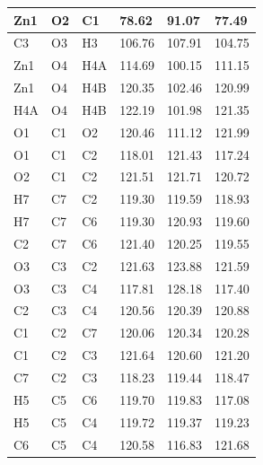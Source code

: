 \begin{table}[H]
\begin{tabular}{|l|l|l|lll|}
Zn1 & O2 & C1 & \multicolumn{1}{l|}{78.62} & \multicolumn{1}{l|}{91.07} & 77.49 \\ \hline
C3 & O3 & H3 & \multicolumn{1}{l|}{106.76} & \multicolumn{1}{l|}{107.91} & 104.75 \\ \hline
Zn1 & O4 & H4A & \multicolumn{1}{l|}{114.69} & \multicolumn{1}{l|}{100.15} & 111.15 \\ \hline
Zn1 & O4 & H4B & \multicolumn{1}{l|}{120.35} & \multicolumn{1}{l|}{102.46} & 120.99 \\ \hline
H4A & O4 & H4B & \multicolumn{1}{l|}{122.19} & \multicolumn{1}{l|}{101.98} & 121.35 \\ \hline
O1 & C1 & O2 & \multicolumn{1}{l|}{120.46} & \multicolumn{1}{l|}{111.12} & 121.99 \\ \hline
O1 & C1 & C2 & \multicolumn{1}{l|}{118.01} & \multicolumn{1}{l|}{121.43} & 117.24 \\ \hline
O2 & C1 & C2 & \multicolumn{1}{l|}{121.51} & \multicolumn{1}{l|}{121.71} & 120.72 \\ \hline
H7 & C7 & C2 & \multicolumn{1}{l|}{119.30} & \multicolumn{1}{l|}{119.59} & 118.93 \\ \hline
H7 & C7 & C6 & \multicolumn{1}{l|}{119.30} & \multicolumn{1}{l|}{120.93} & 119.60 \\ \hline
C2 & C7 & C6 & \multicolumn{1}{l|}{121.40} & \multicolumn{1}{l|}{120.25} & 119.55 \\ \hline
O3 & C3 & C2 & \multicolumn{1}{l|}{121.63} & \multicolumn{1}{l|}{123.88} & 121.59 \\ \hline
O3 & C3 & C4 & \multicolumn{1}{l|}{117.81} & \multicolumn{1}{l|}{128.18} & 117.40 \\ \hline
C2 & C3 & C4 & \multicolumn{1}{l|}{120.56} & \multicolumn{1}{l|}{120.39} & 120.88 \\ \hline
C1 & C2 & C7 & \multicolumn{1}{l|}{120.06} & \multicolumn{1}{l|}{120.34} & 120.28 \\ \hline
C1 & C2 & C3 & \multicolumn{1}{l|}{121.64} & \multicolumn{1}{l|}{120.60} & 121.20 \\ \hline
C7 & C2 & C3 & \multicolumn{1}{l|}{118.23} & \multicolumn{1}{l|}{119.44} & 118.47 \\ \hline
H5 & C5 & C6 & \multicolumn{1}{l|}{119.70} & \multicolumn{1}{l|}{119.83} & 117.08 \\ \hline
H5 & C5 & C4 & \multicolumn{1}{l|}{119.72} & \multicolumn{1}{l|}{119.37} & 119.23 \\ \hline
C6 & C5 & C4 & \multicolumn{1}{l|}{120.58} & \multicolumn{1}{l|}{116.83} & 121.68 \\ \hline

\end{tabular}
\end{table}

